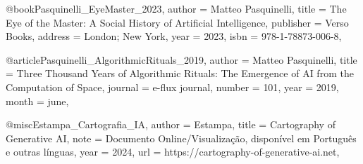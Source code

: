 @book{Pasquinelli_EyeMaster_2023,
  author    = {Matteo Pasquinelli},
  title     = {The Eye of the Master: A Social History of Artificial Intelligence},
  publisher = {Verso Books},
  address   = {London; New York},
  year      = {2023},
  isbn      = {978-1-78873-006-8},
}

@article{Pasquinelli_AlgorithmicRituals_2019,
  author  = {Matteo Pasquinelli},
  title   = {Three Thousand Years of Algorithmic Rituals: The Emergence of AI from the Computation of Space},
  journal = {e-flux journal},
  number  = {101},
  year    = {2019},
  month   = {june}, %
}

@misc{Estampa_Cartografia_IA,
  author       = {Estampa},
  title        = {Cartography of Generative AI},
  note         = {Documento Online/Visualização, disponível em Português e outras línguas},
  year         = {2024},
  url          = {https://cartography-of-generative-ai.net},
}

